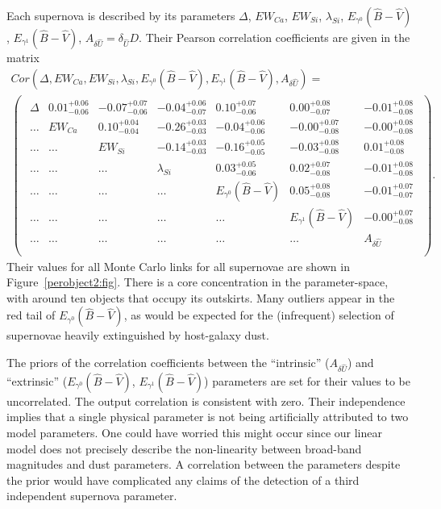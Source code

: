 \documentclass{aastex61}   	%
\begin{document}
Each supernova is described by its parameters
 $\Delta$, $EW_{Ca}$, $EW_{Si}$, $\lambda_{Si}$, $E_{\gamma^0}({\hat{B}}-{\hat{V}})$, $E_{\gamma^1}({\hat{B}}-{\hat{V}})$,  $A_{\delta {\hat{U}}}=\delta_{\hat{U}} D$.
 Their Pearson correlation coefficients are given in the matrix
\begin{multline}
Cor(\Delta, EW_{Ca}, EW_{Si}, \lambda_{Si}, E_{\gamma^0}({\hat{B}}-{\hat{V}}), E_{\gamma^1}({\hat{B}}-{\hat{V}}),  A_{\delta {\hat{U}}}) =\\
\begin{pmatrix}
\begin{array}{rrrrrrr}
\Delta& 0.01^{+0.06}_{-0.06} & -0.07^{+0.07}_{-0.06} & -0.04^{+0.06}_{-0.07} & 0.10^{+0.07}_{-0.06} & 0.00^{+0.08}_{-0.07} & -0.01^{+0.08}_{-0.08} \\
\dots & EW_{Ca} & 0.10^{+0.04}_{-0.04} & -0.26^{+0.03}_{-0.03} & -0.04^{+0.06}_{-0.06} & -0.00^{+0.07}_{-0.08} & -0.00^{+0.08}_{-0.08} \\
\dots  &\dots  &EW_{Si}& -0.14^{+0.03}_{-0.03} & -0.16^{+0.05}_{-0.05} & -0.03^{+0.08}_{-0.08} & 0.01^{+0.08}_{-0.08} \\
\dots  &\dots  & \dots  & \lambda_{Si} & 0.03^{+0.05}_{-0.06} & 0.02^{+0.07}_{-0.08} & -0.01^{+0.08}_{-0.08} \\
\dots &\dots & \dots &\dots  &E_{\gamma^0}({\hat{B}}-{\hat{V}})& 0.05^{+0.08}_{-0.08} & -0.01^{+0.07}_{-0.07} \\
\dots & \dots  &\dots & \dots &\dots  &  E_{\gamma^1}({\hat{B}}-{\hat{V}}) & -0.00^{+0.07}_{-0.08} \\
\dots  &\dots & \dots  & \dots & \dots &\dots  & A_{\delta {\hat{U}}} \\
\end{array}
\end{pmatrix}.
\label{corr2p:eqn}
\end{multline}
Their values for all Monte Carlo links for all supernovae are shown in Figure~\ref{perobject2:fig}.
There is a core concentration in the  parameter-space, with around ten objects that occupy its outskirts.
Many outliers appear in the red tail of $E_{\gamma^0}({\hat{B}}-{\hat{V}})$, as would be expected for the (infrequent) selection of supernovae
heavily extinguished by host-galaxy dust.

The priors of the correlation coefficients between the ``intrinsic''  ($A_{\delta {\hat{U}}}$) and ``extrinsic''
($E_{\gamma^0}({\hat{B}}-{\hat{V}})$, $E_{\gamma^1}({\hat{B}}-{\hat{V}})$)  parameters
are set for their values to be uncorrelated. The output correlation is
consistent with zero.
Their independence implies that a single physical parameter is not being artificially attributed to two
model parameters.  One could have
worried this might
occur since our linear model does not precisely
describe the non-linearity between broad-band magnitudes and dust parameters. A
correlation 
between the parameters despite the prior would have complicated any claims of the detection of a third independent supernova parameter.
\end{document}
